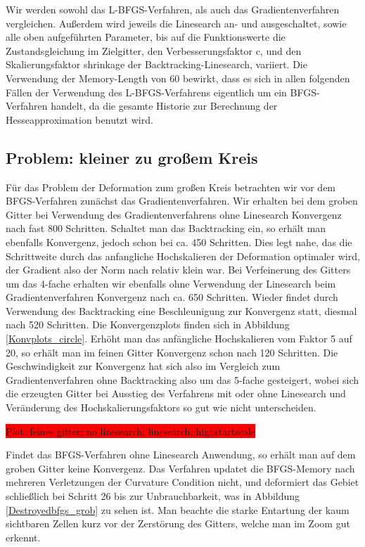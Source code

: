 Wir werden sowohl das L-BFGS-Verfahren, als auch das Gradientenverfahren vergleichen. Außerdem wird jeweils die Linesearch an- und ausgeschaltet, sowie alle oben aufgeführten Parameter, bis auf die Funktionswerte die Zustandsgleichung im Zielgitter, den Verbesserungsfaktor \textsf{c}, und den Skalierungsfaktor \textsf{shrinkage} der Backtracking-Linesearch, variiert. Die Verwendung der Memory-Length von 60 bewirkt, dass es sich in allen folgenden Fällen der Verwendung des L-BFGS-Verfahrens eigentlich um ein BFGS-Verfahren handelt, da die gesamte Historie zur Berechnung der Hesseapproximation benutzt wird. 

\subsection{Problem: kleiner zu großem Kreis}\label{subsect_circle}

Für das Problem der Deformation zum großen Kreis betrachten wir vor dem BFGS-Verfahren zunächst das Gradientenverfahren. Wir erhalten bei dem groben Gitter 
bei Verwendung des Gradientenverfahrens ohne Linesearch Konvergenz nach fast 800 Schritten. Schaltet man das Backtracking ein, so erhält man ebenfalls Konvergenz, jedoch schon bei ca. 450 Schritten. Dies legt nahe, das die Schrittweite durch das anfangliche Hochskalieren der Deformation optimaler wird, der Gradient also der Norm nach relativ klein war. Bei Verfeinerung des Gitters um das 4-fache erhalten wir ebenfalls ohne Verwendung der Linesearch beim Gradientenverfahren Konvergenz nach ca. 650 Schritten. Wieder findet durch Verwendung des Backtracking eine Beschleunigung zur Konvergenz statt, diesmal nach 520 Schritten. Die Konvergenzplots finden sich in Abbildung \ref{Konvplots_circle}. Erhöht man das anfängliche Hochskalieren vom Faktor 5 auf 20, so erhält man im feinen Gitter Konvergenz schon nach 120 Schritten. Die Geschwindigkeit zur Konvergenz hat sich also im Vergleich zum Gradientenverfahren ohne Backtracking also um das 5-fache gesteigert, wobei sich die erzeugten Gitter bei Ausstieg des Verfahrens mit oder ohne Linesearch und Veränderung des Hochskalierungsfaktors so gut wie nicht unterscheiden. 

\colorbox{red}{Plot: feines gitter; no linesearch; linesearch; highstartscale}

Findet das BFGS-Verfahren ohne Linesearch Anwendung, so erhält man auf dem groben Gitter keine Konvergenz. Das Verfahren updatet die BFGS-Memory nach mehreren Verletzungen der Curvature Condition nicht, und deformiert das Gebiet schließlich bei Schritt 26 bis zur Unbrauchbarkeit, was in Abbildung \ref{Destroyedbfgs_grob} zu sehen ist. Man beachte die starke Entartung der kaum sichtbaren Zellen kurz vor der Zerstörung des Gitters, welche man im Zoom gut erkennt.


